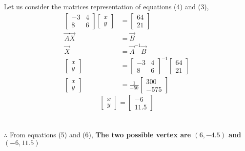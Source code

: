 \documentclass[journal,12pt,twocolumn]{IEEEtran}
\begin{document}
\newpage
\noindent
Let us consider the matrices representation of equations (4) and (3),
\begin{align*}
\begin{bmatrix}
-3 & 4 \\
8 & 6 
\end{bmatrix}
\begin{bmatrix}
x \\ y
\end{bmatrix}
& =
\begin{bmatrix}
64 \\ 21
\end{bmatrix} \\[6pt]
\vec{A}\vec{X} &=\vec{B} \\[6pt]
\vec{X} &= \vec{A}^{-1}\vec{B} \\[6pt]
\begin{bmatrix}
x \\ y
\end{bmatrix}
& =
\begin{bmatrix}
-3 & 4 \\
8 & 6 
\end{bmatrix}^{-1}
\begin{bmatrix}
64 \\ 21
\end{bmatrix} \\[6pt]
\begin{bmatrix}
x \\ y
\end{bmatrix}
& =
\frac{1}{-50}
\begin{bmatrix}
300 \\ -575
\end{bmatrix}
\end{align*}
\begin{equation}
\begin{bmatrix}
x \\ y
\end{bmatrix}
=
\begin{bmatrix}
-6 \\ 11.5
\end{bmatrix}
\end{equation}
\\\\
\noindent
$\therefore$ From equations (5) and (6), \textbf{The two possible vertex are $(6,-4.5)$ and $(-6,11.5)$}
\end{document}
